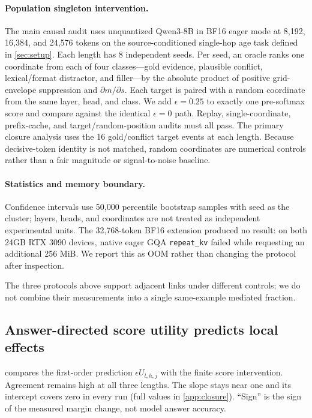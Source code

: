 \paragraph{Population singleton intervention.}
The main causal audit uses unquantized Qwen3-8B in BF16 eager mode at 8,192,
16,384, and 24,576 tokens on the source-conditioned single-hop age task defined
in \cref{sec:setup}.  Each length has 8 independent seeds.  Per seed, an
oracle ranks one coordinate from each of four classes---gold evidence, plausible
conflict, lexical/format distractor, and filler---by the absolute product of
positive grid-envelope suppression and $\partial m/\partial s$.  Each target is
paired with a random coordinate from the same layer, head, and class.  We add
$\epsilon=0.25$ to exactly one pre-softmax score and compare against the
identical $\epsilon=0$ path.  Replay, single-coordinate, prefix-cache, and
target/random-position audits must all pass.  The primary closure analysis uses
the 16 gold/conflict target events at each length.  Because decisive-token
identity is not matched, random coordinates are numerical controls rather than
a fair magnitude or signal-to-noise baseline.

\paragraph{Statistics and memory boundary.}
Confidence intervals use 50,000 percentile bootstrap samples with seed as the
cluster; layers, heads, and coordinates are not treated as independent
experimental units.  The 32,768-token BF16 extension produced no result: on
both 24GB RTX 3090 devices, native eager GQA \texttt{repeat\_kv} failed while
requesting an additional 256 MiB.  We report this as OOM rather than changing
the protocol after inspection.

The three protocols above support adjacent links under different controls; we
do not combine their measurements into a single same-example mediated fraction.

\subsection{Answer-directed score utility predicts local effects}

 compares the first-order prediction
$\epsilon U_{l,h,j}$ with the finite score intervention.  Agreement remains
high at all three lengths.  The slope stays near one and its intercept covers
zero in every run (full values in \cref{app:closure}).  ``Sign'' is the sign of
the measured margin change, not model answer accuracy.

